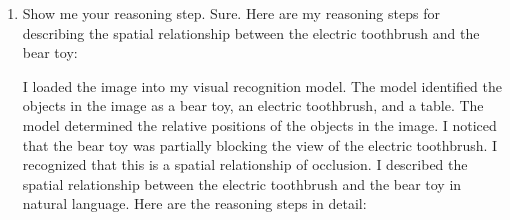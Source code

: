 \begin{enumerate}
\begin{enumerate}
        Here is a more detailed description of the spatial relationship between the electric toothbrush and the bear toy:
        
        The bear toy is sitting on top of the electric toothbrush.
        The toothbrush is partially hidden behind the bear toy.
        The bear toy is facing the viewer, and the toothbrush is facing away from the viewer.
        I hope this helps! Let me know if you have any other questions.
        
        Here are some of the key observations that I made in order to reach my conclusion:
        
        The bear toy is larger than the electric toothbrush.
        The bear toy is sitting on top of the electric toothbrush.
        The toothbrush is partially hidden behind the bear toy.
        The bear toy is facing the viewer, and the toothbrush is facing away from the viewer.
        Based on these observations, I concluded that the bear toy is partially blocking the view of the electric toothbrush. This is a spatial relationship of occlusion.
        \item Show me your reasoning step.
        \subitem Sure. Here are my reasoning steps for describing the spatial relationship between the electric toothbrush and the bear toy:

        I loaded the image into my visual recognition model.
        The model identified the objects in the image as a bear toy, an electric toothbrush, and a table.
        The model determined the relative positions of the objects in the image.
        I noticed that the bear toy was partially blocking the view of the electric toothbrush.
        I recognized that this is a spatial relationship of occlusion.
        I described the spatial relationship between the electric toothbrush and the bear toy in natural language.
        Here are the reasoning steps in detail:
        

\end{enumerate}
\end{enumerate}
